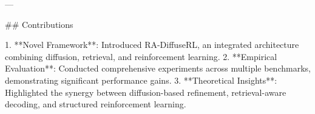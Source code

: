 ---

## Contributions

1. **Novel Framework**: Introduced RA-DiffuseRL, an integrated architecture combining diffusion, retrieval, and reinforcement learning.
2. **Empirical Evaluation**: Conducted comprehensive experiments across multiple benchmarks, demonstrating significant performance gains.
3. **Theoretical Insights**: Highlighted the synergy between diffusion-based refinement, retrieval-aware decoding, and structured reinforcement learning. 

